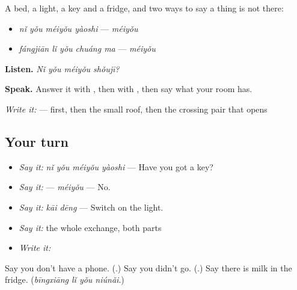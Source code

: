 \begin{grammarlens}[title={What you've built — four things, and what is missing}]
A bed, a light, a key and a fridge, and two ways to say a thing is not there:

\begin{itemize}
\raggedright
  \item \emph{nǐ yǒu méiyǒu yàoshi} — \textbf{} \emph{méiyǒu}
  \item \emph{fángjiān lǐ yǒu chuáng ma} — \textbf{} \emph{méiyǒu}
\end{itemize}

\textbf{Listen.} \emph{Nǐ yǒu méiyǒu shǒujī?}

\textbf{Speak.} Answer it with , then with , then say what your room has.

\emph{Write it:}  —  first, then the small roof, then the crossing pair that opens 
\end{grammarlens}

\subsection*{Your turn}
\begin{itemize}
\raggedright
  \item \emph{Say it:} \emph{nǐ yǒu méiyǒu yàoshi} — Have you got a key?
  \item \emph{Say it:}  — \emph{méiyǒu} — No.
  \item \emph{Say it:} \emph{kāi dēng} — Switch on the light.
  \item \emph{Say it:} the whole exchange, both parts
  \item \emph{Write it:} 
\end{itemize}

\begin{tcolorbox}[breakable,colback=teal!4,colframe=teal!35!black,title={Before you move on}]
Say you don't have a phone. (\textbf{}.) Say you didn't go. (\textbf{}.) Say there is milk in the fridge. (\emph{bīngxiāng lǐ yǒu niúnǎi}.)
\end{tcolorbox}
